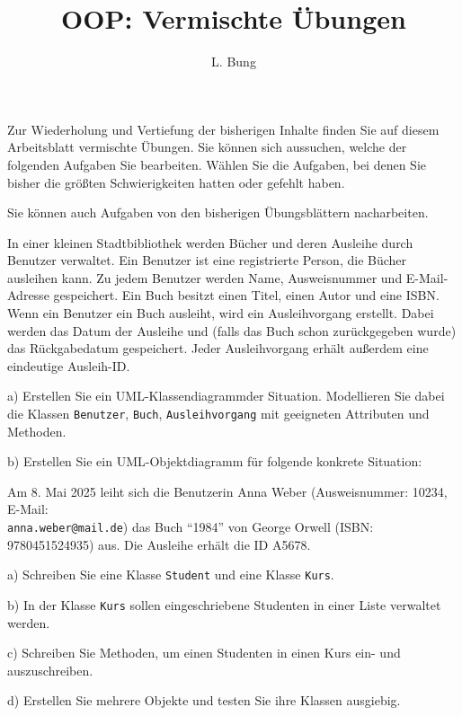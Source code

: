 \documentclass[11pt, a4paper, oneside]{article}
\begin{document}
	\author{L. Bung}
	\title{OOP: Vermischte Übungen}
	\subject{SAE}
	\maketitle
	
	Zur Wiederholung und Vertiefung der bisherigen Inhalte finden Sie auf diesem Arbeitsblatt vermischte Übungen.
	Sie können sich aussuchen, welche der folgenden Aufgaben Sie bearbeiten.
	Wählen Sie die Aufgaben, bei denen Sie bisher die größten Schwierigkeiten hatten oder gefehlt haben.
	
	Sie können auch Aufgaben von den bisherigen Übungsblättern nacharbeiten.
	
	
	In einer kleinen Stadtbibliothek werden Bücher und deren Ausleihe durch Benutzer verwaltet.
	Ein Benutzer ist eine registrierte Person, die Bücher ausleihen kann.
	Zu jedem Benutzer werden Name, Ausweisnummer und E-Mail-Adresse gespeichert.
	Ein Buch besitzt einen Titel, einen Autor und eine ISBN.
	Wenn ein Benutzer ein Buch ausleiht, wird ein Ausleihvorgang erstellt.
	Dabei werden das Datum der Ausleihe und (falls das Buch schon zurückgegeben wurde) das Rückgabedatum gespeichert.
	Jeder Ausleihvorgang erhält außerdem eine eindeutige Ausleih-ID.
	
	a) Erstellen Sie ein UML-Klassendiagramm\footnotemark[1] der Situation.
	Modellieren Sie dabei die Klassen \texttt{Benutzer}, \texttt{Buch}, \texttt{Ausleihvorgang} mit geeigneten Attributen und Methoden.
	
	b) Erstellen Sie ein UML-Objektdiagramm für folgende konkrete Situation:
	
	Am 8. Mai 2025 leiht sich die Benutzerin Anna Weber (Ausweisnummer: 10234, E-Mail:\\ \texttt{anna.weber@mail.de}) das Buch ``1984'' von George Orwell (ISBN: 9780451524935) aus.
	Die Ausleihe erhält die ID A5678.
	
	
	a) Schreiben Sie eine Klasse \texttt{Student} und eine Klasse \texttt{Kurs}.
	
	b) In der Klasse \texttt{Kurs} sollen eingeschriebene Studenten in einer Liste verwaltet werden.
	
	c) Schreiben Sie Methoden, um einen Studenten in einen Kurs ein- und auszuschreiben.
	
	d) Erstellen Sie mehrere Objekte und testen Sie ihre Klassen ausgiebig.
	
\end{document}
